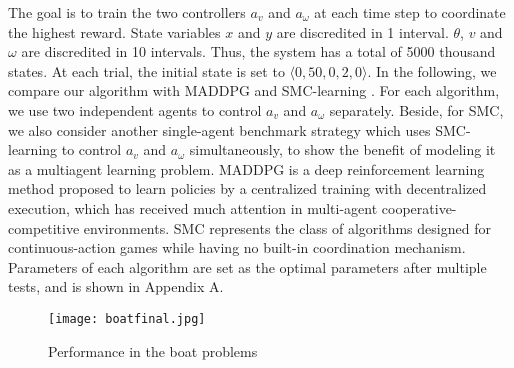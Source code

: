 \documentclass[journal,transmag]{IEEEtran}
\begin{document}
The goal is to train the two controllers $a_v$ and $a_{\omega}$ at each time step to coordinate the highest reward. State variables $x$ and $y$ are discredited in 1 interval. $\theta$, $v$ and $\omega$ are discredited in 10 intervals. Thus, the system has a total of 5000 thousand states. At each trial, the initial state is set to $\langle 0,50,0,2,0\rangle$. In the following, we compare our algorithm with MADDPG \cite{NIPS2017_7217} and SMC-learning \cite{Lazaric2007Reinforcement}. For each algorithm, we use two independent agents to control $a_v$ and $a_{\omega}$ separately. Beside, for SMC, we also consider another single-agent benchmark strategy which uses SMC-learning to control $a_v$ and $a_{\omega}$ simultaneously, to show the benefit of modeling it as a multiagent learning problem. MADDPG is a deep reinforcement learning method proposed to learn policies by a centralized training with decentralized execution, which has received much attention in multi-agent cooperative-competitive environments. SMC represents the class of algorithms designed for continuous-action games while having no built-in coordination mechanism. Parameters of each algorithm are set as the optimal parameters after multiple tests, and is shown in Appendix A.%

\begin{figure}[h!]
\centering
\texttt{[image: boatfinal.jpg]}
\caption{Performance in the boat problems}
\label{fig:boatalgorithm}
\end{figure}
\end{document}
